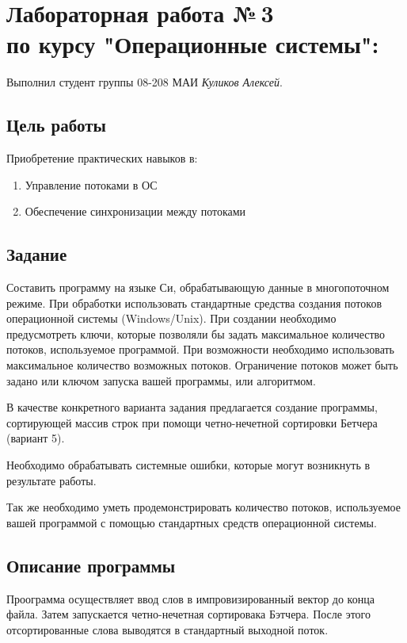\documentclass[12pt]{article}
\begin{document}
\section*{Лабораторная работа №\,3 \\ по курсу "Операционные системы": }

Выполнил студент группы 08-208 МАИ \textit{Куликов Алексей}.

\subsection*{Цель работы}
Приобретение практических навыков в:
 
\begin{enumerate}
   \item Управление потоками в ОС 
   \item Обеспечение синхронизации между потоками
\end{enumerate}

\subsection*{Задание}

Составить программу на языке Си, обрабатывающую данные в многопоточном режиме. При обработки использовать стандартные средства создания потоков операционной системы (Windows/Unix). При создании необходимо предусмотреть ключи, которые позволяли бы задать максимальное количество потоков, используемое программой. При возможности необходимо использовать максимальное количество возможных потоков. Ограничение потоков может быть задано или ключом запуска вашей программы, или алгоритмом.

В качестве конкретного варианта задания предлагается создание программы, сортирующей массив строк при помощи четно-нечетной сортировки Бетчера (вариант 5).

Необходимо обрабатывать системные ошибки, которые могут возникнуть в результате работы.

Так же необходимо уметь продемонстрировать количество потоков, используемое вашей программой с помощью стандартных средств операционной системы.

\subsection*{Описание программы}
Проограмма осуществляет ввод слов в импровизированный вектор до конца файла. Затем запускается четно-нечетная сортировака Бэтчера. После этого отсортированные слова выводятся в стандартный выходной поток.
\end{document}
